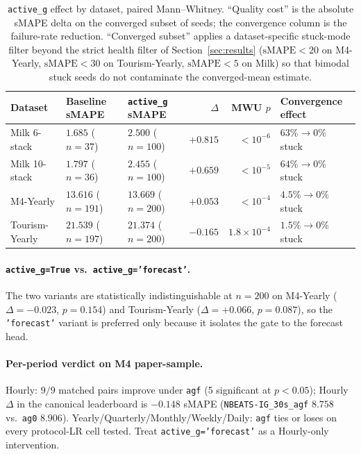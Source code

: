 \documentclass{article}
\begin{document}
\begin{table}[h]
\centering
\small
\caption{\texttt{active\_g} effect by dataset, paired Mann--Whitney. ``Quality cost'' is the absolute sMAPE delta on the converged subset of seeds; the convergence column is the failure-rate reduction. ``Converged subset'' applies a dataset-specific stuck-mode filter beyond the strict health filter of Section~\ref{sec:results} ($\mathrm{sMAPE}<20$ on M4-Yearly, $\mathrm{sMAPE}<30$ on Tourism-Yearly, $\mathrm{sMAPE}<5$ on Milk) so that bimodal stuck seeds do not contaminate the converged-mean estimate.}
\label{tab:active_g_ablation}
\begin{tabular}{@{}lllrrl@{}}
\toprule
Dataset & Baseline sMAPE & \texttt{active\_g} sMAPE & $\Delta$ & MWU $p$ & Convergence effect \\
\midrule
Milk 6-stack    & $1.685$ ($n{=}37$)   & $2.500$ ($n{=}100$)  & $+0.815$ & $<10^{-6}$  & $63\% \to 0\%$ stuck \\
Milk 10-stack   & $1.797$ ($n{=}36$)   & $2.455$ ($n{=}100$)  & $+0.659$ & $<10^{-5}$  & $64\% \to 0\%$ stuck \\
M4-Yearly       & $13.616$ ($n{=}191$) & $13.669$ ($n{=}200$) & $+0.053$ & $<10^{-4}$  & $4.5\% \to 0\%$ stuck \\
Tourism-Yearly  & $21.539$ ($n{=}197$) & $21.374$ ($n{=}200$) & $-0.165$ & $1.8\times 10^{-4}$ & $1.5\% \to 0\%$ stuck \\
\bottomrule
\end{tabular}
\end{table}

\paragraph{\texttt{active\_g=True} vs.\ \texttt{active\_g='forecast'}.} The two variants are statistically indistinguishable at $n=200$ on M4-Yearly ($\Delta = -0.023$, $p=0.154$) and Tourism-Yearly ($\Delta = +0.066$, $p=0.087$), so the \texttt{'forecast'} variant is preferred only because it isolates the gate to the forecast head.

\paragraph{Per-period verdict on M4 paper-sample.} Hourly: $9/9$ matched pairs improve under \texttt{agf} (5 significant at $p<0.05$); Hourly $\Delta$ in the canonical leaderboard is $-0.148$ sMAPE (\texttt{NBEATS-IG\_30s\_agf} $8.758$ vs.\ \texttt{ag0} $8.906$). Yearly/Quarterly/Monthly/Weekly/Daily: \texttt{agf} ties or loses on every protocol-LR cell tested. Treat \texttt{active\_g='forecast'} as a Hourly-only intervention.
\end{document}
